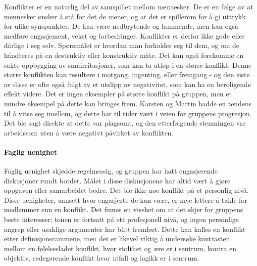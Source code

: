 Konflikter er en naturlig del av samspillet mellom mennesker. 
De er en følge av at mennesker ønsker å stå for det de mener, og at det er spillerom for å gi uttrykk for ulike synspunkter. De kan være nedbrytende og lammende, men kan også medføre engasjement, vekst og forbedringer.
Konflikter er derfor ikke gode eller dårlige i seg selv. Spørsmålet er hvordan man forholder seg til dem, og om de håndteres på en destruktiv eller konstruktiv måte\cite{helsekompetanse}. 
Det kan også forekomme en sakte oppbygging av småirritasjoner, som kan ta utløp i en større konflikt.
Denne større konflikten kan resultere i motgang, ingenting, eller fremgang - og den siste av disse er ofte også fulgt av et utslipp av negativitet, som kan ha en beroligende effekt videre. 
Det er ingen eksempler på større konflikt på gruppen, men et mindre eksempel på dette kan bringes frem.
Karsten og Martin hadde en tendens til å vitse seg imellom, og dette har til tider vært i veien for gruppens progresjon. Det ble sagt direkte at dette var plagsomt, og den etterfølgende stemningen var arbeidssom uten å være negativt påvirket av konflikten.

\paragraph{Faglig uenighet}
Faglig uenighet skjedde regelmessig, og gruppen har hatt engasjerende diskusjoner rundt bordet. 
Målet i disse diskusjonene har altid vært å gjøre oppgaven eller samarbeidet bedre.
Det ble ikke noe konflikt på et personlig nivå. 
Disse uenigheter, uansett hvor engasjerte de kan være, er mye lettere å takle for medlemmer enn en konflikt. 
Det finnes en visshet om at det skjer for gruppens beste interesser; tonen er fortsatt på ett profesjonell nivå, og ingen personlige angrep eller usaklige argumenter har blitt fremført. 
Dette kan kalles en konflikt etter definisjonsrammene, men det er likevel viktig å undersøke kontrasten mellom en følelsesladet konflikt, hvor stolthet og ære er i sentrum, kontra en objektiv, redegørende konflikt hvor utfall og logikk er i sentrum. 






